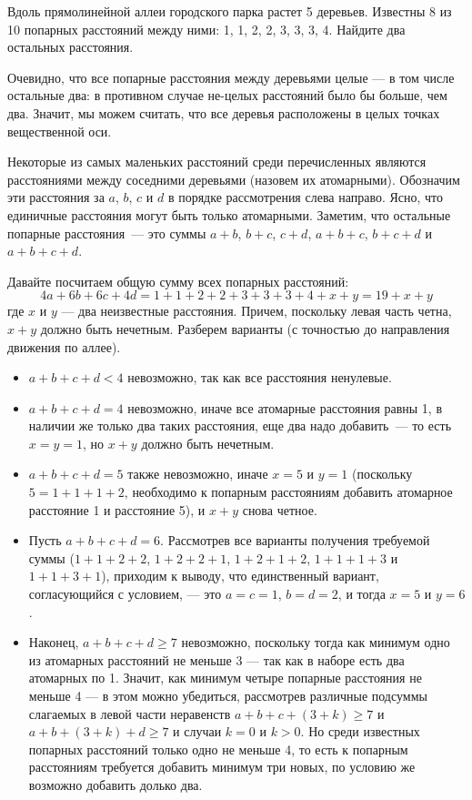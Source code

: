
\begin{itemize}

\def\met#1{\SI{#1}{\text{м}}}
\itC Вдоль прямолинейной аллеи городского парка растет 5 деревьев. 
Известны 8 из 10 попарных расстояний между ними: 
\met 1, \met 1, \met 2, \met 2, \met 3, \met 3, \met 3, \met 4. 
Найдите два остальных расстояния.

\itr Очевидно, что все попарные расстояния между деревьями целые — 
в том числе остальные два: в противном случае не-целых расстояний 
было бы больше, чем два. Значит, мы можем считать, что все деревья 
расположены в целых точках вещественной оси.

Некоторые из самых маленьких расстояний среди перечисленных являются 
расстояниями между соседними деревьями (назовем их атомарными). 
Обозначим эти расстояния за $a$, $b$, $c$ и $d$ в порядке рассмотрения
слева направо. 
Ясно, что единичные расстояния могут быть только атомарными. 
Заметим, что остальные попарные расстояния~--- это суммы
$a+b$, $b+c$, $c+d$, $a+b+c$, $b+c+d$ и $a+b+c+d$.

Давайте посчитаем общую сумму всех попарных расстояний:
$$4a + 6b + 6c + 4d = 1+1+2+2+3+3+3+4 + x+y = 19+x+y$$
где $x$ и $y$ --- два неизвестные расстояния.
Причем, поскольку левая часть четна, $x+y$ должно быть нечетным.
Разберем варианты (с точностью до направления движения по аллее).

\begin{itemize}
\item $a+b+c+d < 4$ невозможно, так как все расстояния ненулевые. 
\item $a+b+c+d = 4$ невозможно, иначе все атомарные расстояния равны \met 1, 
в наличии же только два таких расстояния, еще два надо добавить~--- 
то есть $x=y=1$, но $x+y$ должно быть нечетным.
\item $a+b+c+d = 5$ также невозможно, иначе $x=5$ и $y=1$
(поскольку $5=1+1+1+2$, необходимо к попарным расстояниям добавить 
атомарное расстояние \met 1 и расстояние \met 5), и $x+y$ снова четное. 
\item Пусть $a+b+c+d = 6$. 
Рассмотрев все варианты получения требуемой суммы ($1+1+2+2$, $1+2+2+1$, 
$1+2+1+2$, $1+1+1+3$ и $1+1+3+1$), приходим к выводу, что единственный
вариант, согласующийся с условием, --- это $a=c=1$, $b=d=2$, и тогда $x=5$ и $y=6$.
\item Наконец, $a+b+c+d \ge 7$ невозможно, поскольку тогда 
как минимум одно из атомарных расстояний не меньше \met 3 --- так как
в наборе есть два атомарных по \met 1. Значит,
как минимум четыре попарные расстояния не меньше \met 4 ---
в этом можно убедиться, рассмотрев различные подсуммы
слагаемых в левой части неравенств $a+b+c+(3+k) \ge 7$ и $a+b+(3+k)+d \ge 7$
и случаи $k = 0$ и $k > 0$.
Но среди известных попарных расстояний только одно не меньше \met 4, 
то есть к попарным расстояниям требуется добавить минимум 
три новых, по условию же возможно добавить долько два.
\end{itemize}


\end{itemize}

